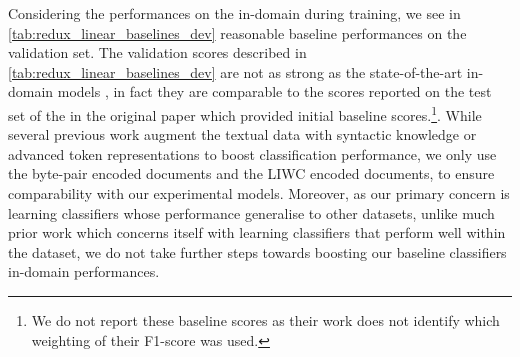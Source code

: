 \begin{table}[]
\centering
{}
\caption{Optimal parameters for linear Support Vector Machine baselines.}
\label{tab:liwc_baseline_linear_params}
\end{table}

Considering the performances on the in-domain during training, we see in \autoref{tab:redux_linear_baselines_dev} reasonable baseline performances on the validation set. The validation scores described in \autoref{tab:redux_linear_baselines_dev} are not as strong as the state-of-the-art in-domain models \cite{Salminen:2020}, in fact they are comparable to the scores reported on the test set of the in the original paper \cite{Davidson:2017} which provided initial baseline scores.\footnote{We do not report these baseline scores as their work does not identify which weighting of their F1-score was used.}. While several previous work augment the textual data with syntactic knowledge \cite{Davidson:2017} or advanced token representations \cite{Salminen:2020} to boost classification performance, we only use the byte-pair encoded documents and the LIWC encoded documents, to ensure comparability with our experimental models. Moreover, as our primary concern is learning classifiers whose performance generalise to other datasets, unlike much prior work which concerns itself with learning classifiers that perform well within the dataset, we do not take further steps towards boosting our baseline classifiers in-domain performances.


